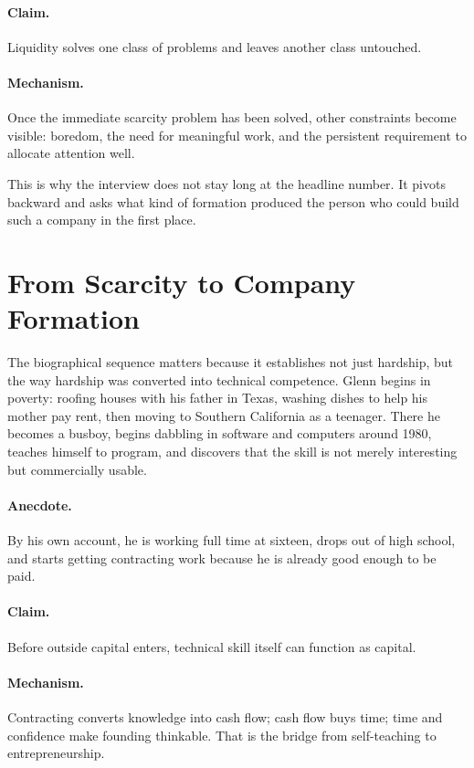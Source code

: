 \paragraph{Claim.} Liquidity solves one class of problems and leaves another class untouched.

\paragraph{Mechanism.} Once the immediate scarcity problem has been solved, other constraints become visible: boredom, the need for meaningful work, and the persistent requirement to allocate attention well.

This is why the interview does not stay long at the headline number. It pivots backward and asks what kind of formation produced the person who could build such a company in the first place.

\section{From Scarcity to Company Formation}

The biographical sequence matters because it establishes not just hardship, but the way hardship was converted into technical competence. Glenn begins in poverty: roofing houses with his father in Texas, washing dishes to help his mother pay rent, then moving to Southern California as a teenager. There he becomes a busboy, begins dabbling in software and computers around 1980, teaches himself to program, and discovers that the skill is not merely interesting but commercially usable.

\paragraph{Anecdote.} By his own account, he is working full time at sixteen, drops out of high school, and starts getting contracting work because he is already good enough to be paid.

\paragraph{Claim.} Before outside capital enters, technical skill itself can function as capital.

\paragraph{Mechanism.} Contracting converts knowledge into cash flow; cash flow buys time; time and confidence make founding thinkable. That is the bridge from self-teaching to entrepreneurship.

